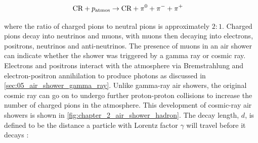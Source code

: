 \begin{equation}
    \begin{aligned}
    \text{CR} + p_\text{atmos} &\rightarrow \text{CR} + \pionneutral + \pionminus + \pionplus
    \end{aligned}
\end{equation}

\noindent where the ratio of charged pions to neutral pions is approximately $2:1$. Charged pions decay into neutrinos and muons, with muons then decaying into electrons, positrons, neutrinos and anti-neutrinos. The presence of muons in an air shower can indicate whether the shower was triggered by a gamma ray or cosmic ray. Electrons and positrons interact with the atmosphere via Bremstrahlung and electron-positron annihilation to produce photons as discussed in \autoref{sec:05_air_shower_gamma_ray}. Unlike gamma-ray air showers, the original cosmic ray can go on to undergo further proton-proton collisions to increase the number of charged pions in the atmosphere. This development of cosmic-ray air showers is shown in \autoref{fig:chapter_2_air_shower_hadron}.
\newpar
The decay length, $d$, is defined to be the distance a particle with Lorentz factor $\gamma$ will travel before it decays \citep{MATTHEWS2005387}:

